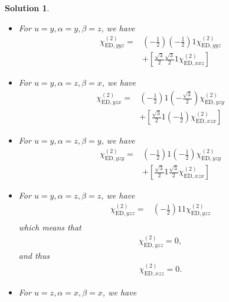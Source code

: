 \documentclass[UTF8,10pt,a4paper]{article}
\theoremstyle{Problem}
\theoremstyle{Solution}
\newtheorem*{sol}{Solution}
\begin{document}
\begin{sol}
\begin{itemize}
\begin{align}
\nonumber\chi_{\text{ED},yyy}^{(2)}=&\left(-\frac{1}{2}\right)\left(-\frac{1}{2}\right)\left(-\frac{1}{2}\right)\chi_{\text{ED},yyy}^{(2)}\\
&+\left[\frac{\sqrt{3}}{2}\frac{\sqrt{3}}{2}\left(-\frac{1}{2}\right)\chi_{\text{ED},xxy}^{(2)}\right]+\left[\left(-\frac{1}{2}\right)\frac{\sqrt{3}}{2}\frac{\sqrt{3}}{2}\chi_{\text{ED},yxx}^{(2)}\right]+\left[\frac{\sqrt{3}}{2}\left(-\frac{1}{2}\right)\frac{\sqrt{3}}{2}\chi_{\text{ED},xyx}^{(2)}\right]
\end{align}\normalsize
\item For $u=y,\alpha=y,\beta=z$, we have
\small\begin{align}
\nonumber\chi_{\text{ED},yyz}^{(2)}=&\left(-\frac{1}{2}\right)\left(-\frac{1}{2}\right)1\chi_{\text{ED},yyz}^{(2)}\\
&+\left[\frac{\sqrt{3}}{2}\frac{\sqrt{3}}{2}1\chi_{\text{ED},xxz}^{(2)}\right]
\end{align}\normalsize
\item For $u=y,\alpha=z,\beta=x$, we have
\small\begin{align}
\nonumber\chi_{\text{ED},yzx}^{(2)}=&\left(-\frac{1}{2}\right)1\left(-\frac{\sqrt{3}}{2}\right)\chi_{\text{ED},yzy}^{(2)}\\
&+\left[\frac{\sqrt{3}}{2}1\left(-\frac{1}{2}\right)\chi_{\text{ED},xzx}^{(2)}\right]
\end{align}\normalsize
\item For $u=y,\alpha=z,\beta=y$, we have
\small\begin{align}
\nonumber\chi_{\text{ED},yzy}^{(2)}=&\left(-\frac{1}{2}\right)1\left(-\frac{1}{2}\right)\chi_{\text{ED},yzy}^{(2)}\\
&+\left[\frac{\sqrt{3}}{2}1\frac{\sqrt{3}}{2}\chi_{\text{ED},xzx}^{(2)}\right]
\end{align}\normalsize
\item For $u=y,\alpha=z,\beta=z$, we have
\small\begin{align}
\nonumber\chi_{\text{ED},yzz}^{(2)}=&\left(-\frac{1}{2}\right)11\chi_{\text{ED},yzz}^{(2)}\\
&
\end{align}\normalsize
which means that
\begin{align}
    \chi_{\text{ED},yzz}^{(2)}=0,
\end{align}
and thus
\begin{align}
    \chi_{\text{ED},xzz}^{(2)}=0.
\end{align}
\item For $u=z,\alpha=x,\beta=x$, we have

\end{itemize}
\end{sol}
\end{document}
